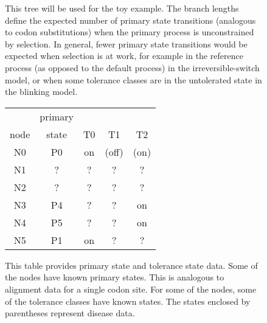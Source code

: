 \documentclass{article}
\begin{document}
\begin{figure}
\centering
{}
\caption{
	This tree will be used for the toy example.
	The branch lengths define the expected number of
	primary state transitions (analogous to codon substitutions)
	when the primary process is unconstrained by selection.
	In general, fewer primary state transitions would be expected
	when selection is at work, for example in the reference process
	(as opposed to the default process) in the irreversible-switch model,
	or when some tolerance classes are in the untolerated state
	in the blinking model.
}
\end{figure}

\begin{figure}
\centering
\begin{tabular}{c c c c c}
	     & primary &    &    &    \\
	node & state   & T0 & T1 & T2 \\
  \hline
  N0 & P0 & on & (off) & (on) \\
  N1 & ? & ? & ? & ? \\
  N2 & ? & ? & ? & ? \\
  N3 & P4 & ? & ? & on \\
  N4 & P5 & ? & ? & on \\
  N5 & P1 & on & ? & ?
\end{tabular}
\caption{
	This table provides primary state and tolerance state data.
	Some of the nodes have known primary states.
	This is analogous to alignment data for a single codon site.
	For some of the nodes,
	some of the tolerance classes have known states.
	The states enclosed by parentheses represent
	disease data.
}
\end{figure}
\end{document}
